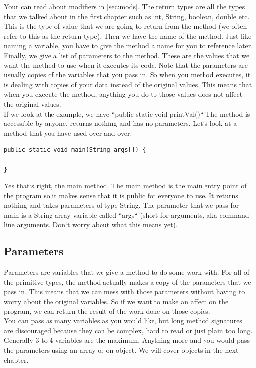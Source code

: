 \documentclass[11]{article}
\begin{document}
Your can read about modifiers in \autoref{sec:mods}. The return types are all the types that we talked about in the first chapter such as int, String, boolean, double etc. This is the type of value that we are going to return from the method (we often refer to this as the return type). Then we have the name of the method. Just like naming a variable, you have to give the method a name for you to reference later. Finally, we give a list of parameters to the method. These are the values that we want the method to use when it executes its code. Note that the parameters are usually copies of the variables that you pass in. So when you method executes, it is dealing with copies of your data instead of the original values. This means that when you execute the method, anything you do to those values does not affect the original values.\\

If we look at the example, we have ``public static void printVal()`` The method is accessible by anyone, returns nothing and has no parameters. Let`s look at a method that you have used over and over.

\begin{lstlisting}
public static void main(String args[]) {

}
\end{lstlisting}
Yes that`s right, the main method. The main method is the main entry point of the program so it makes sense that it is public for everyone to use. It returns nothing and takes parameters of type String. The parameter that we pass for main is a String array variable called ``args`` (short for arguments, aka command line arguments. Don`t worry about what this means yet).

\subsection{Parameters}
Parameters are variables that we give a method to do some work with. For all of the primitive types, the method actually makes a copy of the parameters that we pass in. This means that we can mess with those parameters without having to worry about the original variables. So if we want to make an affect on the program, we can return the result of the work done on those copies.\\

You can pass as many variables as you would like, but long method signatures are discouraged because they can be complex, hard to read or just plain too long. Generally 3 to 4 variables are the maximum. Anything more and you would pass the parameters using an array or on object. We will cover objects in the next chapter. \\
\end{document}
